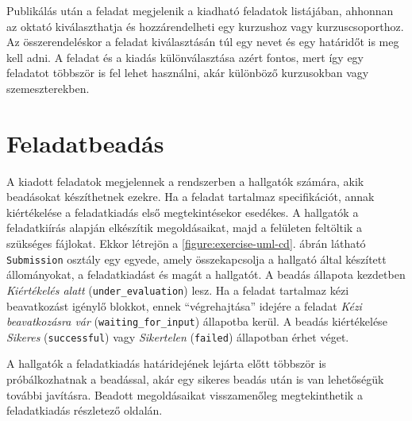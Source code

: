 Publikálás után a feladat megjelenik a kiadható feladatok listájában, ahhonnan az oktató kiválaszthatja és hozzárendelheti egy kurzushoz vagy kurzuscsoporthoz.
Az összerendeléskor a feladat kiválasztásán túl egy nevet és egy határidőt is meg kell adni.
A feladat és a kiadás különválasztása azért fontos, mert így egy feladatot többször is fel lehet használni, akár különböző kurzusokban vagy szemeszterekben.

\section{Feladatbeadás}\label{section:submission}
A kiadott feladatok megjelennek a rendszerben a hallgatók számára, akik beadásokat készíthetnek ezekre.
Ha a feladat tartalmaz specifikációt, annak kiértékelése a feladatkiadás első megtekintésekor esedékes.
A hallgatók a feladatkiírás alapján elkészítik megoldásaikat, majd a felületen feltöltik a szükséges fájlokat.
Ekkor létrejön a \ref{figure:exercise-uml-cd}. ábrán látható \texttt{Submission} osztály egy egyede, amely összekapcsolja a hallgató által készített állományokat, a feladatkiadást és magát a hallgatót.
A beadás állapota kezdetben \textit{Kiértékelés alatt} (\texttt{under\_evaluation}) lesz.
Ha a feladat tartalmaz kézi beavatkozást igénylő blokkot, ennek ``végrehajtása'' idejére a feladat \textit{Kézi beavatkozásra vár} (\texttt{waiting\_for\_input}) állapotba kerül.
A beadás kiértékelése \textit{Sikeres} (\texttt{successful}) vagy \textit{Sikertelen} (\texttt{failed}) állapotban érhet véget.

A hallgatók a feladatkiadás határidejének lejárta előtt többször is próbálkozhatnak a beadással, akár egy sikeres beadás után is van lehetőségük további javításra.
Beadott megoldásaikat visszamenőleg megtekinthetik a feladatkiadás részletező oldalán.

